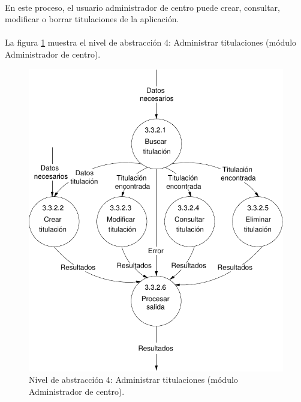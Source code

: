 \paragraph{}En este proceso, el usuario administrador de centro puede crear,
consultar, modificar o borrar titulaciones de la aplicación.

\paragraph{}La figura \ref{diagramaNivel4-AdministrarTitulaciones-admCentro}
muestra el nivel de abstracción 4: Administrar titulaciones (módulo
Administrador de centro).

  \begin{figure}[!ht]
    \begin{center}
      \includegraphics[]{08.Analisis_Funcional/8.2.DFDs/Niveles/Nivel4/AdministradorCentro/AdministrarTitulaciones/Diagramas/nivel4-AdministrarTitulaciones.pdf}
      \caption{Nivel de abstracción 4: Administrar titulaciones (módulo Administrador de centro).}
      \label{diagramaNivel4-AdministrarTitulaciones-admCentro}
    \end{center}
  \end{figure}
